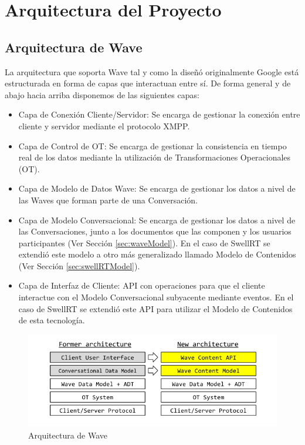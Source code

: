 \newpage
\thispagestyle{sectioned}
\chapter{Arquitectura del Proyecto}

\section{Arquitectura de Wave}

	La arquitectura que soporta Wave tal y como la diseñó originalmente Google está estructurada en forma de capas que interactuan entre sí. De forma general y de abajo hacia arriba disponemos de las siguientes capas:
	
	\begin{itemize}
		\item Capa de Conexión Cliente/Servidor: Se encarga de gestionar la conexión entre cliente y servidor mediante el protocolo XMPP.
		\item Capa de Control de OT: Se encarga de gestionar la consistencia en tiempo real de los datos mediante la utilización de Transformaciones Operacionales (OT).
		\item Capa de Modelo de Datos Wave: Se encarga de gestionar los datos a nivel de las Waves que forman parte de una Conversación.
		\item Capa de Modelo Conversacional: Se encarga de gestionar los datos a nivel de las Conversaciones, junto a los documentos que las componen y los usuarios participantes (Ver Sección \ref{sec:waveModel}). En el caso de SwellRT se extendió este modelo a otro más generalizado llamado Modelo de Contenidos (Ver Sección \ref{sec:swellRTModel}).
		\item Capa de Interfaz de Cliente: API con operaciones para que el cliente interactue con el Modelo Conversacional subyacente mediante eventos. En el caso de SwellRT se extendió este API para utilizar el Modelo de Contenidos de esta tecnología. 
	\end{itemize}
	
	\begin{figure}[H]
	  \centering
	    \includegraphics[keepaspectratio, scale=0.6]{Media/Captures/waveArch.png}
	  \caption{Arquitectura de Wave}
	  \label{fig:waveArch}
	\end{figure}
	


